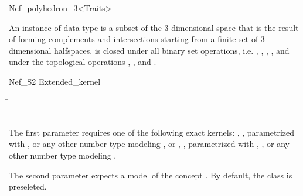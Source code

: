 
\ccRefPageBegin


\begin{ccRefClass}{Nef_polyhedron_3<Traits>}

\ccDefinition

An instance of data type  is a subset of the
3-dimensional space that is the result of forming complements and intersections
starting from a finite set  of
3-dimensional halfspaces.  is closed under all binary set
operations, i.e. , , ,
, and under the topological operations ,
, and .

Nef_S2
Extended_kernel


\ccParameters

\begin{tabbing}
 \=\\
                 \>\\
\end{tabbing}

The first parameter requires one of the following exact kernels:
, ,  
parametrized with ,  or any other number type
modeling \Z, or , , 
 parametrized with , ,
 or any other number type modeling \Q.

The second parameter expects a model of the concept .
By default, the class  is preseleted.

\ccTypes


\end{ccRefClass}
